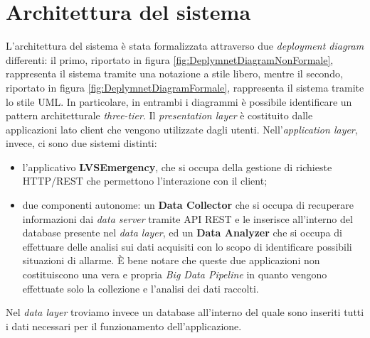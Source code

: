 \clearpage
\section{Architettura del sistema}
L'architettura del sistema è stata formalizzata attraverso due \textit{deployment diagram} differenti: il primo, riportato in figura \ref{fig:DeplymnetDiagramNonFormale}, rappresenta il sistema tramite una notazione a stile libero, mentre il secondo, riportato in figura \ref{fig:DeplymnetDiagramFormale}, rappresenta il sistema tramite lo stile UML. In particolare, in entrambi i diagrammi è possibile identificare un pattern architetturale \textit{three-tier}. 
Il \textit{presentation layer} è costituito dalle applicazioni lato client che vengono utilizzate dagli utenti. Nell'\textit{application layer}, invece, ci sono due sistemi distinti:

\begin{itemize}
	\item l'applicativo \textbf{LVSEmergency}, che si occupa della gestione di richieste HTTP/REST che permettono l'interazione con il client;
	\item due componenti autonome: un \textbf{Data Collector} che si occupa di recuperare informazioni dai \textit{data server} tramite API REST e le inserisce all'interno del database presente nel \textit{data layer}, ed un \textbf{Data Analyzer} che si occupa di effettuare delle analisi sui dati acquisiti con lo scopo di identificare possibili situazioni di allarme. È bene notare che queste due applicazioni non costituiscono una vera e propria \textit{Big Data Pipeline} in quanto vengono effettuate solo la collezione e l'analisi dei dati raccolti. 
\end{itemize}

Nel \textit{data layer} troviamo invece un database all'interno del quale sono inseriti tutti i dati necessari per il funzionamento dell'applicazione.

